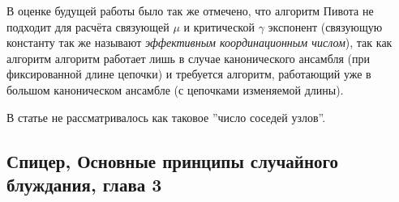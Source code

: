 В оценке будущей работы было так же отмечено, что алгоритм Пивота не подходит для расчёта связующей $\mu$ и критической $\gamma$ экспонент (связующую константу так же называют \textit{эффективным координационным числом}), так как алгоритм алгоритм работает лишь в случае канонического ансамбля (при фиксированной длине цепочки) и требуется алгоритм, работающий уже в большом каноническом ансамбле (с цепочками изменяемой длины).

В статье не рассматривалось как таковое ''число соседей узлов''.


\subsection{Спицер, Основные принципы случайного блуждания, глава 3}

